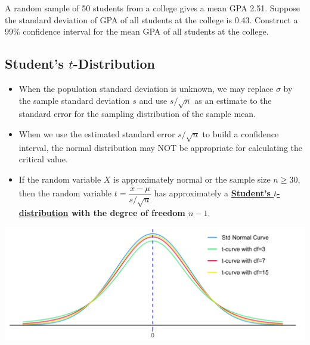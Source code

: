 \begin{example}

A random sample of 50 students from a college gives a mean GPA 2.51.
Suppose the standard deviation of GPA of all students at the college is
0.43. Construct a 99\% confidence interval for the mean GPA of all
students at the college.

\end{example}
\vspace*{6\baselineskip}


\hypertarget{students-t-distribution}{%
\subsection{\texorpdfstring{Student's
\(t\)-Distribution}{Student's t-Distribution}}\label{students-t-distribution}}

\begin{itemize}
\item
  When the population standard deviation is unknown, we may replace
  \(\sigma\) by the sample standard deviation \(s\) and use
  \(s/\sqrt{n}\) as an estimate to the standard error for the sampling
  distribution of the sample mean.
\item
  When we use the estimated standard error \(s / \sqrt{n}\) to build a
  confidence interval, the normal distribution may NOT be
  appropriate for calculating the critical value.
\item
  If the random variable \(X\) is approximately normal or the sample size $n\ge 30$, then the
  random variable \(t=\dfrac{\bar{x}-\mu}{s / \sqrt{n}}\) has approximately a
  \textbf{\href{https://en.wikipedia.org/wiki/Student\%27s_t-distribution}{Student's
  \(t\)-distribution} with the degree of freedom \(n-1\)}.
\end{itemize}

\includegraphics[width=\textwidth]{Figures/t-curves}


